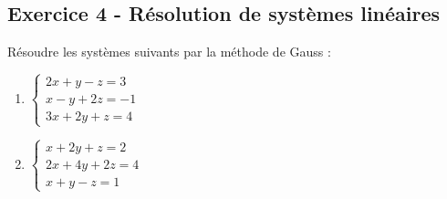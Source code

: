 \documentclass[12pt,a4paper]{article}
\begin{document}
\subsection*{Exercice 4 - Résolution de systèmes linéaires \niveau{\moyen}}

\begin{boiteexercice}
Résoudre les systèmes suivants par la méthode de Gauss :
\begin{enumerate}[label=(\alph*)]
  \item $\begin{cases}2x + y - z = 3\\ x - y + 2z = -1\\ 3x + 2y + z = 4\end{cases}$

  \item $\begin{cases}x + 2y + z = 2\\ 2x + 4y + 2z = 4\\ x + y - z = 1\end{cases}$
\end{enumerate}
\end{boiteexercice}
\end{document}
